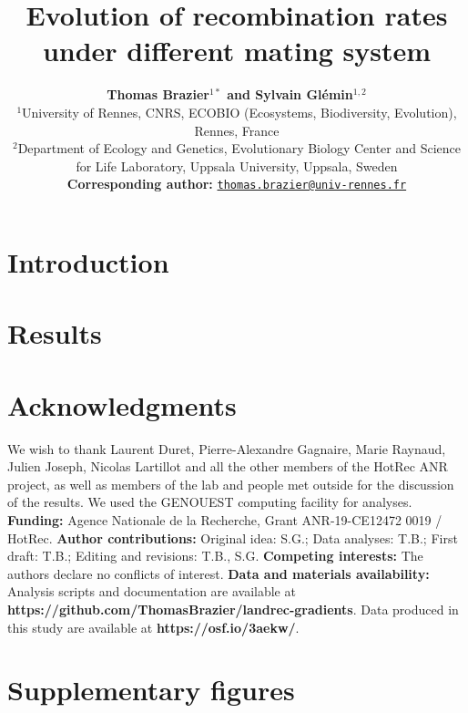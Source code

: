 \documentclass{article}
\title{Evolution of recombination rates under different mating system}
\author{
    \large
    \textbf{Thomas {Brazier}$^{1*}$\orcidlink{0000-0001-5990-7545} and Sylvain {Glémin}$^{1,2}$\orcidlink{0000-0001-7260-4573}}\\
    \normalsize
    $^{1}$University of Rennes, CNRS, ECOBIO (Ecosystems, Biodiversity, Evolution), Rennes, France\\
    $^{2}$Department of Ecology and Genetics, Evolutionary Biology Center and Science for Life Laboratory, Uppsala University, Uppsala, Sweden \\
    \textbf{Corresponding author:} \texttt{\href{mailto:thomas.brazier@univ-rennes.fr}{thomas.brazier@univ-rennes.fr}} \\
}
\begin{document}
\maketitle

\begin{abstract}
\end{abstract}


\newpage


\section*{Introduction}



\section*{Results}




\section*{Acknowledgments}

We wish to thank Laurent Duret, Pierre-Alexandre Gagnaire, Marie Raynaud, Julien Joseph, Nicolas Lartillot and all the other members of the HotRec ANR project, as well as members of the lab and people met outside for the discussion of the results. We used the GENOUEST computing facility for analyses. \textbf{Funding:} Agence Nationale de la Recherche, Grant ANR-19-CE12472 0019 / HotRec. \textbf{Author contributions:} Original idea: S.G.; Data analyses: T.B.; First draft: T.B.; Editing and revisions: T.B., S.G. \textbf{Competing interests:} The authors declare no conflicts of interest. \textbf{Data and materials availability:} Analysis scripts and documentation are available at \textbf{https://github.com/ThomasBrazier/landrec-gradients}. Data produced in this study are available at \textbf{https://osf.io/3aekw/}.


\printbibliography



\section*{Supplementary figures}

\renewcommand{\thefigure}{S\arabic{figure}}
\end{document}
